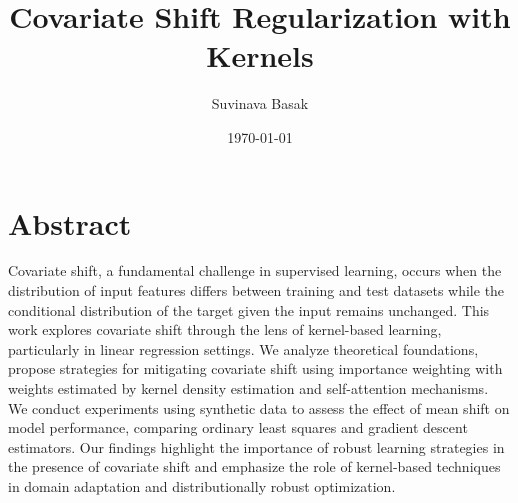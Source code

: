 \documentclass[a4paper,12pt,twoside]{report} %
\theoremstyle{definition}
\theoremstyle{proposition}
\theoremstyle{example}
\begin{document}
\pagestyle{fancy}
\fancyhead{}                                 %
\fancyfoot{}                                 %

\fancyhead[LE, RO]{\small\nouppercase{\rightmark}}  %

\fancyfoot[C]{\small\thepage}  %

\renewcommand{\headrulewidth}{0pt}

\title{\textbf{Covariate Shift Regularization with Kernels}}
\author{Suvinava Basak}
\date{\today}
\maketitle

\cleardoublepage

\titleformat{\section}[block]
{\normalfont\Huge\bfseries}{}{0pt}{}

\newpage
\vspace*{5cm} %
\section*{Abstract}
Covariate shift, a fundamental challenge in supervised learning, occurs when the distribution of input features differs between training and test datasets while the conditional distribution of the target given the input remains unchanged. This work explores covariate shift through the lens of kernel-based learning, particularly in linear regression settings. We analyze theoretical foundations, propose strategies for mitigating covariate shift using importance weighting with weights estimated by kernel density estimation and self-attention mechanisms.\\

We conduct experiments using synthetic data to assess the effect of mean shift on model performance, comparing ordinary least squares and gradient descent estimators. Our findings highlight the importance of robust learning strategies in the presence of covariate shift and emphasize the role of kernel-based techniques in domain adaptation and distributionally robust optimization.
\end{document}
